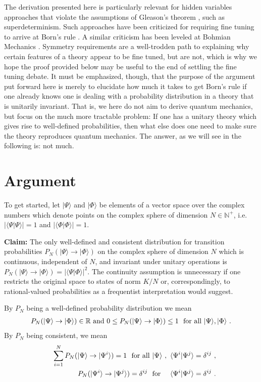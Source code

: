 \documentclass[12pt]{article}
\def\forall{\hbox{\rm for all}}
\def\beqn{\begin{eqnarray}}
\def\eeqn{\end{eqnarray}}
\begin{document}
The derivation presented here is particularly relevant for hidden variables approaches that violate the assumptions of Gleason’s theorem \cite{Gleason}, such as superdeterminism. Such approaches have been criticized for requiring fine tuning to arrive at Born’s rule \cite{wood, sen1, sen2}. A similar criticism has been leveled at Bohmian Mechanics \cite{colin}. Symmetry requirements are a well-trodden path to explaining why certain features of a theory appear to be fine tuned, but are not, which is why we hope the proof provided below may be useful to the end of settling the fine tuning debate.
It must be emphasized, though, that the purpose of the argument put forward here is merely to elucidate how much it takes to get Born’s rule if one already knows one is dealing with a probability distribution in a theory that is unitarily invariant. That is, we here do not aim to derive quantum mechanics, but focus on the much more tractable problem: If one has a unitary theory which gives rise to well-defined probabilities, then what else does one need to make sure the theory reproduces quantum mechanics. The answer, as we will see in the following is: not much.

\section{Argument}

To get started, let $|\Psi \rangle$ and $|\Phi \rangle$ be elements of a vector space over the complex numbers which denote points on the complex sphere of dimension $N \in {\mathbb{N}}^+$, i.e. $|\langle \Psi | \Psi \rangle| =1$ and $|\langle \Phi | \Phi \rangle| =1$.
\bigskip

{\bf Claim:} The only well-defined and consistent distribution for transition probabilities $P_N(|\Psi\rangle \to |\Phi\rangle)$ on the complex sphere of dimension $N$ which is continuous, independent of $N$, and invariant under unitary operations is $P_N(| \Psi \rangle \to |\Phi \rangle) = |\langle \Psi | \Phi \rangle|^2$. The continuity assumption is unnecessary if one restricts the original space to states of norm $K/N$ or, correspondingly, to rational-valued probabilities as a frequentist interpretation would suggest. 
\bigskip

\noindent By $P_N$ being a well-defined probability distribution we mean
\beqn
P_N(|\Psi\rangle \to |\Phi\rangle) \in \mathbb{R} ~\mbox{and}~ 0 \leq P_N(|\Psi\rangle \to |\Phi\rangle) \leq 1 ~~\forall~ |\Psi \rangle, |\Phi \rangle ~. \label{welldef}
\eeqn
By $P_N$ being consistent, we mean
\beqn
&& \sum_{i=1}^N P_N(|\Psi\rangle \to |\Psi^i\rangle) = 1 ~~ \forall~ |\Psi \rangle~,~ \langle \Psi^i |\Psi^j\rangle = \delta^{ij} ~, \label{norm} \\
&& P_N(|\Psi^i\rangle \to |\Psi^j\rangle) = \delta^{ij} ~~ {\mbox{for}}~~~~ \langle \Psi^i |\Psi^j\rangle = \delta^{ij} \label{orth}~.
\eeqn
\end{document}
